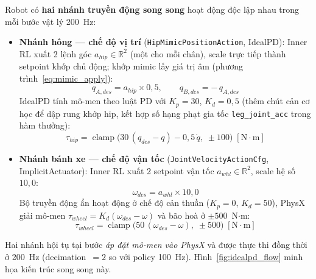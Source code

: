 Robot có \textbf{hai nhánh truyền động song song} hoạt động độc lập nhau
trong mỗi bước vật lý 200~Hz:

\begin{itemize}
    \item \textbf{Nhánh hông — chế độ vị trí} (\texttt{HipMimicPositionAction},
    IdealPD): Inner RL xuất 2 lệnh góc $a_{hip}\in\mathbb{R}^2$ (một cho mỗi
    chân), scale trực tiếp thành setpoint khớp chủ động; khớp mimic lấy giá
    trị âm (phương trình~\eqref{eq:mimic_apply}):
    \begin{equation}
        q_{A,des} = a_{hip}\times 0{,}5,\qquad q_{B,des} = -\,q_{A,des}
        \label{eq:hip_setpoint}
    \end{equation}
    IdealPD tính mô-men theo luật PD với $K_p = 30$, $K_d = 0{,}5$ (thêm chút
    cản cơ học để dập rung khớp hip, kết hợp số hạng phạt gia tốc
    \texttt{leg\_joint\_acc} trong hàm thưởng):
    \begin{equation}
        \tau_{hip} = \operatorname{clamp}\!\bigl(30\,(q_{des}-q) - 0{,}5\,\dot{q},\;\pm100\bigr)\;\mathrm{[N{\cdot}m]}
        \label{eq:tau_hip_idealpd}
    \end{equation}

    \item \textbf{Nhánh bánh xe — chế độ vận tốc}
    (\texttt{JointVelocityActionCfg}, ImplicitActuator): Inner RL xuất 2
    setpoint vận tốc $a_{whl}\in\mathbb{R}^2$, scale hệ số $10{,}0$:
    \begin{equation}
        \omega_{des} = a_{whl} \times 10{,}0
        \label{eq:wheel_setpoint_idealpd}
    \end{equation}
    Bộ truyền động ẩn hoạt động ở chế độ cản thuần ($K_p=0$, $K_d=50$), PhysX
    giải mô-men $\tau_{wheel}=K_d(\omega_{des}-\omega)$ và bão hoà ở
    $\pm500$~N$\cdot$m:
    \begin{equation}
        \tau_{wheel} = \operatorname{clamp}\!\bigl(50\,(\omega_{des}-\omega),\;\pm500\bigr)\;\mathrm{[N{\cdot}m]}
        \label{eq:tau_wheel_idealpd}
    \end{equation}
\end{itemize}

Hai nhánh hội tụ tại bước \textit{áp đặt mô-men vào PhysX} và được thực thi
đồng thời ở 200~Hz (decimation~$=2$ so với policy 100~Hz).
Hình~\ref{fig:idealpd_flow} minh họa kiến trúc song song này.

